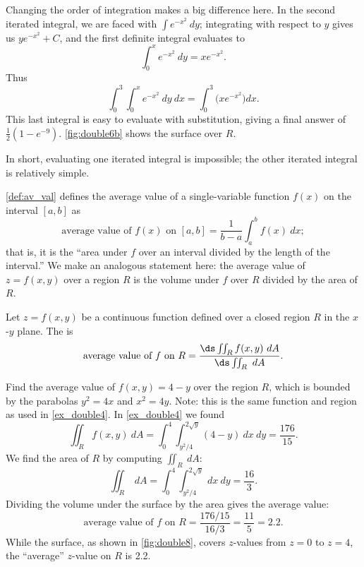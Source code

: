 {Changing the order of integration makes a big difference here. In the second iterated integral, we are faced with $\int e^{-x^2}\ dy$; integrating with respect to $y$ gives us $ye^{-x^2}+C$, and the first definite integral evaluates to 
\[\int_0^x e^{-x^2}\ dy = xe^{-x^2}.\]
%
%
%
Thus 
\[\int_0^3\int_0^x e^{-x^2}\ dy\ dx = \int_0^3\Big(xe^{-x^2}\Big)dx.\]
This last integral is easy to evaluate with substitution, giving a final answer of $\frac12(1-e^{-9})%
$. \autoref{fig:double6b} shows the surface over $R$.

In short, evaluating one iterated integral is impossible; the other iterated integral is relatively simple.}

\autoref{def:av_val} defines the average value of a single-variable function $f(x)$ on the interval $[a,b]$ as
\[\text{average value of $f(x)$ on $[a,b]$} = \frac1{b-a}\int_a^b f(x)\ dx;\]
that is, it is the ``area under $f$ over an interval divided by the length of the interval.'' We make an analogous statement here: the average value of $z=f(x,y)$ over a region $R$ is the volume under $f$ over $R$ divided by the area of $R$.

{Let $z=f(x,y)$ be a continuous function defined over a closed region $R$ in the $x$-$y$ plane. The  is 
\[\text{average value of $f$ on $R$} = \frac{\ds \iint_R f(x,y)\ dA}{\ds\iint_R \ dA}.\]}

{Find the average value of $f(x,y) = 4-y$ over the region $R$, which is bounded by the parabolas $y^2=4x$ and $x^2=4y$. Note: this is the same function and region as used in \autoref{ex_double4}.
}
{In \autoref{ex_double4} we found 
\[\iint_R f(x,y)\ dA = \int_0^4\int_{y^2/4}^{2\sqrt{y}}(4-y)\ dx\ dy = \frac{176}{15}.\] 
We find the area of $R$ by computing $\iint_R \ dA$:
\[\iint_R \ dA = \int_0^4\int_{y^2/4}^{2\sqrt{y}} \ dx\ dy = \frac{16}{3}.\]
%
%
%
Dividing the volume under the surface by the area gives the average value:
\[\text{average value of $f$ on $R$} = \frac{176/15}{16/3} = \frac{11}5 = 2.2.\]
While the surface, as shown in \autoref{fig:double8}, covers $z$-values from $z=0$ to $z=4$, the ``average'' $z$-value on $R$ is 2.2.}

